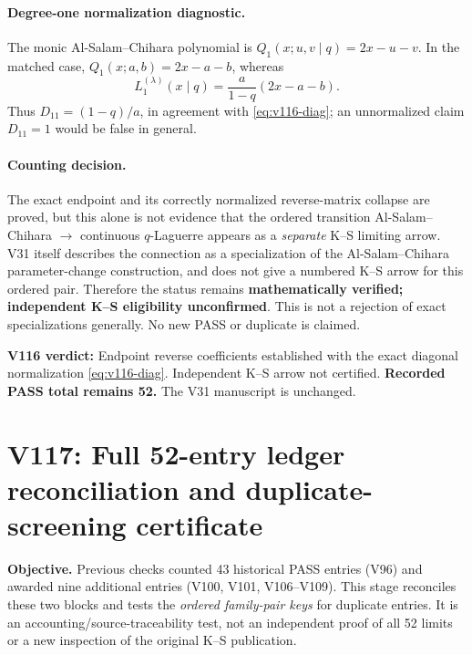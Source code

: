 \documentclass[11pt]{article}
\begin{document}
\paragraph{Degree-one normalization diagnostic.}
The monic Al-Salam--Chihara polynomial is $Q_1(x;u,v\mid q)=2x-u-v$. In the matched case, $Q_1(x;a,b)=2x-a-b$, whereas
\[
 L_1^{(\lambda)}(x\mid q)=\frac{a}{1-q}(2x-a-b).
\]
Thus $D_{11}=(1-q)/a$, in agreement with \eqref{eq:v116-diag}; an unnormalized claim $D_{11}=1$ would be false in general.

\paragraph{Counting decision.}
The exact endpoint and its correctly normalized reverse-matrix collapse are proved, but this alone is not evidence that the ordered transition Al-Salam--Chihara $\to$ continuous $q$-Laguerre appears as a \emph{separate} K--S limiting arrow. V31 itself describes the connection as a specialization of the Al-Salam--Chihara parameter-change construction, and does not give a numbered K--S arrow for this ordered pair. Therefore the status remains \textbf{mathematically verified; independent K--S eligibility unconfirmed}. This is not a rejection of exact specializations generally. No new PASS or duplicate is claimed.

\noindent\textbf{V116 verdict:} Endpoint reverse coefficients established with the exact diagonal normalization \eqref{eq:v116-diag}. Independent K--S arrow not certified. \textbf{Recorded PASS total remains 52.} The V31 manuscript is unchanged.


\clearpage
\section{V117: Full 52-entry ledger reconciliation and duplicate-screening certificate}
\noindent\textbf{Objective.} Previous checks counted 43 historical PASS entries (V96) and awarded nine additional entries (V100, V101, V106--V109). This stage reconciles these two blocks and tests the \emph{ordered family-pair keys} for duplicate entries. It is an accounting/source-traceability test, not an independent proof of all 52 limits or a new inspection of the original K--S publication.
\end{document}
